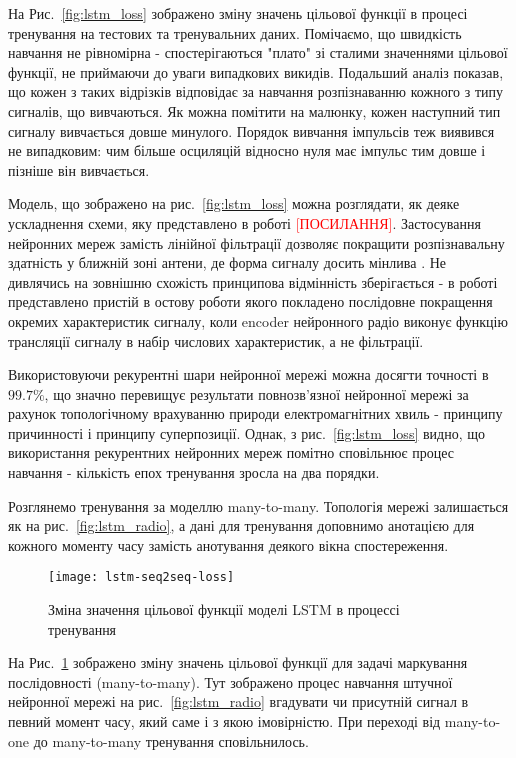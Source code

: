 На Рис.~\ref{fig:lstm_loss} зображено зміну значень цільової функції в процесі
тренування на тестових та тренувальних даних. Помічаємо, що швидкість навчання 
не рівномірна - спостерігаються "плато" зі сталими значеннями цільової функції,
не приймаючи до уваги випадкових викидів. Подальший аналіз показав, що кожен з 
таких відрізків відповідає за навчання розпізнаванню кожного з типу сигналів, 
що вивчаються. Як можна помітити на малюнку, кожен наступний тип сигналу 
вивчається довше минулого. Порядок вивчання імпульсів теж виявився не 
випадковим: чим більше осциляцій відносно нуля має імпульс тим довше і 
пізніше він вивчається.

Модель, що зображено на рис.~\ref{fig:lstm_loss} можна розглядати, як деяке 
ускладнення схеми, яку представлено в роботі \textcolor{red}{[ПОСИЛАННЯ]}.
Застосування нейронних мереж замість лінійної фільтрації дозволяє покращити
розпізнавальну здатність у ближній зоні антени, де форма сигналу досить мінлива 
\cite{my:UWBUSIS2018}. Не дивлячись на зовнішню схожість принципова відмінність 
зберігається - в роботі представлено пристій в остову роботи якого покладено 
послідовне покращення окремих характеристик сигналу, коли encoder нейронного 
радіо виконує функцію трансляції сигналу в набір числових характеристик, а не 
фільтрації.

Використовуючи рекурентні шари нейронної мережі можна досягти точності в 
$ 99.7\% $, що значно перевищує результати повнозв'язної нейронної мережі 
за рахунок топологічному врахуванню природи електромагнітних хвиль - 
принципу причинності і принципу суперпозиції. Однак, з 
рис.~\ref{fig:lstm_loss} видно, що використання рекурентних нейронних мереж 
помітно сповільнює процес навчання - кількість епох тренування зросла на 
два порядки.

Розглянемо тренування за моделлю many-to-many. Топологія мережі залишається 
як на рис.~\ref{fig:lstm_radio}, а дані для тренування доповнимо анотацією 
для кожного моменту часу замість анотування деякого вікна спостереження.

\begin{figure}[htbp] \begin{center}
\texttt{[image: lstm-seq2seq-loss]}
\caption{Зміна значення цільової функції моделі LSTM
в процессі тренування} \label{fig:lstm_seq2seq_loss}
\end{center} \end{figure}

На Рис.~\ref{fig:lstm_seq2seq_loss} зображено зміну значень цільової функції
для задачі маркування послідовності (many-to-many). Тут зображено процес 
навчання штучної нейронної мережі на рис.~\ref{fig:lstm_radio} вгадувати 
чи присутній сигнал в певний момент часу, який саме і з якою імовірністю.
При переході від many-to-one до many-to-many тренування сповільнилось. 

